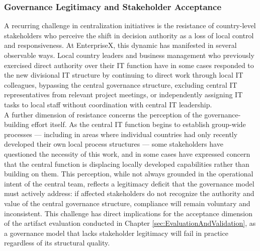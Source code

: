 \subsubsection{Governance Legitimacy and Stakeholder Acceptance}
\label{subsubsec:GovernanceLegitimacy}
A recurring challenge in centralization initiatives is the resistance of country-level stakeholders who perceive the shift in decision authority as a loss of local control and responsiveness.
At EnterpriseX, this dynamic has manifested in several observable ways.
Local country leaders and business management who previously exercised direct authority over their IT function have in some cases responded to the new divisional IT structure by continuing to direct work through local IT colleagues, bypassing the central governance structure, excluding central IT representatives from relevant project meetings, or independently assigning IT tasks to local staff without coordination with central IT leadership.
\\
A further dimension of resistance concerns the perception of the governance-building effort itself.
As the central IT function begins to establish group-wide processes — including in areas where individual countries had only recently developed their own local process structures — some stakeholders have questioned the necessity of this work, and in some cases have expressed concern that the central function is displacing locally developed capabilities rather than building on them.
This perception, while not always grounded in the operational intent of the central team, reflects a legitimacy deficit that the governance model must actively address: if affected stakeholders do not recognize the authority and value of the central governance structure, compliance will remain voluntary and inconsistent.
This challenge has direct implications for the acceptance dimension of the artifact evaluation conducted in Chapter \ref{sec:EvaluationAndValidation}, as a governance model that lacks stakeholder legitimacy will fail in practice regardless of its structural quality.

